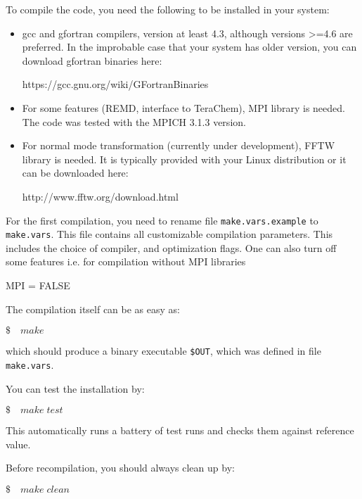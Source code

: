 To compile the code, you need the following to be installed in your system:
\begin{itemize}
\item gcc and gfortran compilers, version at least 4.3, although versions >=4.6 are preferred.
In the improbable case that your system has older version, you can download gfortran binaries here:

https://gcc.gnu.org/wiki/GFortranBinaries

\item For some features (REMD, interface to TeraChem), MPI library is needed. The code was tested with the MPICH 3.1.3 version.

\item For normal mode transformation (currently under development), FFTW library is needed. It is typically provided with your Linux distribution or it can be downloaded here:

http://www.fftw.org/download.html 

\end{itemize}

\noindent
For the first compilation, you need to rename file \verb|make.vars.example| to \verb|make.vars|.
This file contains all customizable compilation parameters. This includes the choice of compiler, and optimization flags. One can also turn off some features i.e. for compilation without MPI libraries

\medskip
\colorbox{black!20}{MPI = FALSE}

\noindent
The compilation itself can be as easy as:

\medskip
\colorbox{black!20}{$ \$\quad make$}

\noindent which should produce a binary executable \verb|$OUT|, which was defined in file \verb|make.vars|.

\bigskip\noindent
You can test the installation by:

\medskip
\colorbox{black!20}{$ \$ \quad make \; test$}

\medskip\noindent
This automatically runs a battery of test runs and checks them against reference value.

\medskip
\noindent Before recompilation, you should always clean up by:

\medskip
\colorbox{black!20}{$ \$ \quad make \; clean$}
